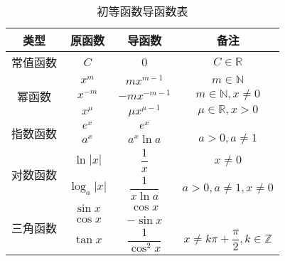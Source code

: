 \begin{table}
  \centering
  \caption{初等函数导函数表}
  \renewcommand\arraystretch{1.8}
  \begin{tabular}{|c|c|c|c|}
    \hline
    类型                        & 原函数                                              & 导函数                       & 备注                                           \\
    \hline
    常值函数                    & $C$                                                 & $0$                          & $C\in \mathbb{R}$                              \\
    \hline
    \multirow{3}{*}{幂函数}     & $x^m$                                               & $mx^{m - 1}$                 & $m \in \mathbb{N}$                             \\
                                & $x^{-m}$                                            & $-mx^{-m - 1}$               & $m \in \mathbb{N},x \ne 0$                     \\
                                & $x^\mu$                                             & $\mu x^{\mu - 1}$            & $\mu \in \mathbb{R}, x > 0$                    \\
    \hline
    \multirow{2}{*}{指数函数}   & $e^x$                                               & $e^x$                        &                                                \\
                                & $a^x$                                               & $a^x\ln a$                   & $a > 0, a \ne 1$                               \\
    \hline
    \multirow{2}{*}{对数函数}   & $\ln |x|$                                           & $\dfrac{1}{x}$               & $x \ne 0$                                      \\[8pt]
                                & $\log_a|x|$                                         & $\dfrac{1}{x\ln a}$          & $a > 0, a \ne 1, x \ne 0$                      \\[5pt]
    \hline
    \multirow{4}{*}{三角函数}   & $\sin x$                                            & $\cos x$                     &                                                \\
                                & $\cos x$                                            & $-\sin x$                    &                                                \\
                                & $\tan x$                                            & $\dfrac{1}{\cos^{2}x}$       & $x \ne k\pi + \dfrac{\pi}{2}, k\in \mathbb{Z}$ \\

\end{tabular}
\end{table}
